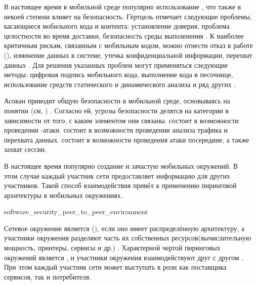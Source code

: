 %
В настоящее время в мобильной среде популярно использование , что также в некоей степени влияет на безопасность. 
%
Гёртцель отмечает следующие проблемы, касающиеся мобильного кода и контента: установление доверия, проблема целостности во время доставки, безопасность среды выполенения .
%
К наиболее критичным рискам, связанным с мобильным кодом, можно отнести отказ в работе (), изменение данных в системе, утечка конфиденциальной информации, перехват данных .
%
Для решения указанных проблем могут применяться следующие методы: цифровая подпись мобильного кода, выполнение кода в песочнице, использование средств статического и динамического анализа и ряд других    . 

%
Асокан приводит общую  безопасности в мобильной среде, основываясь на понятии  (см. ) .
%
Согласно ей, угрозы безопасности делятся на категории в зависимости от того, с каким элементом  они связаны. 
%
 состоит в возможности проведении -атаки.
%
 состоит в возможности проведении анализа трафика и перехвата данных.
%
 состоит в возможности проведения атаки посередине, а также захват сессии.

%
В настоящее время популярно создание  и зачастую  мобильных окружений. 
%
В этом случае каждый участник сети предоставляет информацию для других участников. 
%
Такой способ взаимодействия привёл к применению пиринговой архитектуры в мобильных окружениях. 


	{software_security_peer_to_peer_environment}

%
Сетевое окружение является  (), если оно имеет распределённую архитектуру, а участники окружения разделяют часть их собственных ресурсов(вычислительную мощность, принтеры, сервисы и др.) .
%
Характерной чертой пиринговых окружений является , и участники окружения взаимодействуют друг с другом . 
%
При этом каждый участник сети может выступать в роли как поставщика сервисов, так и потребителя. 

